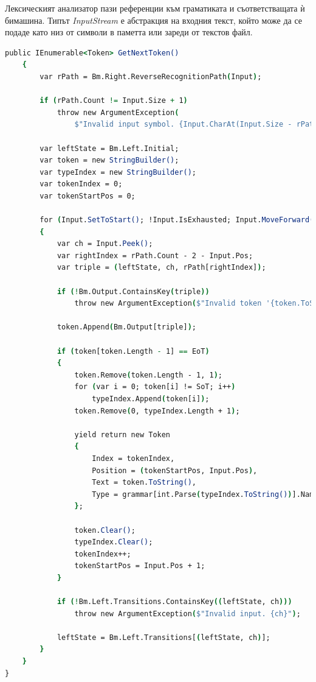 \documentclass[12pt, oneside]{article}
\theoremstyle{definition}
\begin{document}
Лексическият анализатор пази референции към граматиката и съответстващата ѝ бимашина. Типът \emph{InputStream} е абстракция на входния текст, който може да се подаде като низ от символи в паметта или зареди от текстов файл.

\begin{lstlisting}[language=csh,firstnumber=15]
    public IEnumerable<Token> GetNextToken()
    {
        var rPath = Bm.Right.ReverseRecognitionPath(Input);

        if (rPath.Count != Input.Size + 1)
            throw new ArgumentException(
                $"Invalid input symbol. {Input.CharAt(Input.Size - rPath.Count)}");

        var leftState = Bm.Left.Initial;
        var token = new StringBuilder();
        var typeIndex = new StringBuilder();
        var tokenIndex = 0;
        var tokenStartPos = 0;

        for (Input.SetToStart(); !Input.IsExhausted; Input.MoveForward())
        {
            var ch = Input.Peek();
            var rightIndex = rPath.Count - 2 - Input.Pos;
            var triple = (leftState, ch, rPath[rightIndex]);

            if (!Bm.Output.ContainsKey(triple))
                throw new ArgumentException($"Invalid token '{token.ToString() + ch}'");

            token.Append(Bm.Output[triple]);

            if (token[token.Length - 1] == EoT)
            {
                token.Remove(token.Length - 1, 1);
                for (var i = 0; token[i] != SoT; i++)
                    typeIndex.Append(token[i]);
                token.Remove(0, typeIndex.Length + 1);

                yield return new Token
                {
                    Index = tokenIndex,
                    Position = (tokenStartPos, Input.Pos),
                    Text = token.ToString(),
                    Type = grammar[int.Parse(typeIndex.ToString())].Name
                };

                token.Clear();
                typeIndex.Clear();
                tokenIndex++;
                tokenStartPos = Input.Pos + 1;
            }

            if (!Bm.Left.Transitions.ContainsKey((leftState, ch)))
                throw new ArgumentException($"Invalid input. {ch}");

            leftState = Bm.Left.Transitions[(leftState, ch)];
        }
    }
}
\end{lstlisting}
\end{document}
